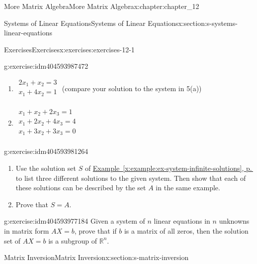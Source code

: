 \documentclass[twoside,10pt,]{book}
\newcommand{\xreffont}{\relax}
\numberwithin{equation}{section}
\begin{document}
\begin{chapterptx}{More Matrix Algebra}{}{More Matrix Algebra}{}{}{x:chapter:chapter_12}
\begin{sectionptx}{Systems of Linear Equations}{}{Systems of Linear Equations}{}{}{x:section:s-systems-linear-equations}
\begin{exercises-subsection}{Exercises}{}{Exercises}{}{}{x:exercises:exercises-12-1}
\begin{divisionexercise}{5}{}{}{g:exercise:idm404593987472}
\begin{enumerate}[label=(\alph*)]
\item{}\(\begin{array}{l}
2 x_1+ x_2=3 \\
x_1+4 x_2=1 \\
\end{array}\) (compare your solution to the system in 5(a))%
\item{}\(\begin{array}{l}
x_1+x_2+2 x_3=1 \\
x_1+2 x_2+4 x_3=4 \\
x_1+3 x_2+3 x_3=0 \\
\end{array}\)%
\end{enumerate}
%
\end{divisionexercise}%
\begin{divisionexercise}{6}{}{}{g:exercise:idm404593981264}%
%
\begin{enumerate}[label=(\alph*)]
\item{}Use the solution set \(S\) of \hyperref[x:example:ex-system-infinite-solutions]{Example~{\xreffont\ref{x:example:ex-system-infinite-solutions}}, p.\,\pageref{x:example:ex-system-infinite-solutions}} to list three different solutions to the given system. Then show that each of these solutions can be described by the set \(A\) in the same example.%
\item{}Prove that \(S = A\).%
\end{enumerate}
%
\end{divisionexercise}%
\begin{divisionexercise}{7}{}{}{g:exercise:idm404593977184}%
Given a system of \(n\) linear equations in \(n\) unknowns in matrix form \(A X = b\), prove that if \(b\) is a matrix of all zeros, then the solution set of \(A X = b\) is a subgroup of \(\mathbb{R}^n\).%
\end{divisionexercise}%
\end{exercises-subsection}
\end{sectionptx}
%
%
\typeout{************************************************}
\typeout{************************************************}
%
\begin{sectionptx}{Matrix Inversion}{}{Matrix Inversion}{}{}{x:section:s-matrix-inversion}
%
%
%
\typeout{************************************************}
\typeout{************************************************}

\end{sectionptx}
\end{chapterptx}
\end{document}
